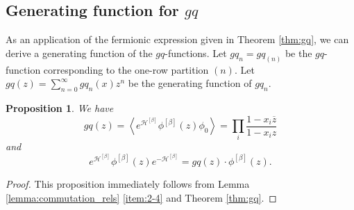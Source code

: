 \documentclass{amsart}
\newtheorem{prop}[thm]{Proposition}
\begin{document}
\subsection{Generating function for $gq$}

As an application of the fermionic expression given in Theorem \ref{thm:gq}, we can derive a generating function of the $gq$-functions.
Let $gq_n=gq_{(n)}$ be the $gq$-function corresponding to the one-row partition $(n)$.
Let $gq(z)=\sum_{n=0}^\infty gq_n(x)z^n$ be the generating function of $gq_n$.


\begin{prop}
We have
\begin{equation}\label{eq:gen_gq_one_row}
gq(z)=\left\langle
e^{\mathcal{H}^{[\beta]}}\phi^{[\beta]}(z)\phi_0
\right\rangle
=\prod_i\frac{1-x_i\overline{z}}{1-x_iz}
\end{equation}
and
\begin{equation}\label{eq:generating_gq_gen}
e^{\mathcal{H}^{[\beta]}}\phi^{[\beta]}(z)e^{-\mathcal{H}^{[\beta]}}=gq(z)\cdot \phi^{[\beta]}(z).
\end{equation}
\end{prop}
\begin{proof}
This proposition immediately follows from Lemma \ref{lemma:commutation_rels} \eqref{item:2-4} and Theorem \ref{thm:gq}.
\end{proof}
\end{document}
